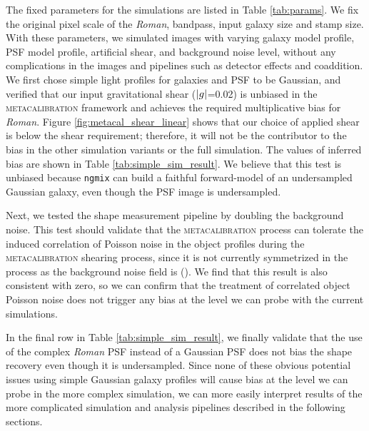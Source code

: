 \documentclass[fleqn,usenatbib]{mnras}
\begin{document}
The fixed parameters for the simulations are listed in Table \ref{tab:params}. We fix the original pixel scale of the \emph{Roman}, bandpass, input galaxy size and stamp size. With these parameters, we simulated images with varying galaxy model profile, PSF model profile, artificial shear, and background noise level, without any complications in the images and pipelines such as detector effects and coaddition. We first chose simple light profiles for galaxies and PSF to be Gaussian, and verified that our input gravitational shear ($\abs{g}$=0.02) is unbiased in the \textsc{metacalibration} framework and achieves the required multiplicative bias for \emph{Roman}. Figure \ref{fig:metacal_shear_linear} shows that our choice of applied shear is below the shear requirement; therefore, it will not be the contributor to the bias in the other simulation variants or the full simulation. The values of inferred bias are shown in Table \ref{tab:simple_sim_result}. We believe that this test is unbiased because \texttt{ngmix} can build a faithful forward-model of an undersampled Gaussian galaxy, even though the PSF image is undersampled.

Next, we tested the shape measurement pipeline by doubling the background noise. This test should validate that the \textsc{metacalibration} process can tolerate the induced correlation of Poisson noise in the object profiles during the \textsc{metacalibration} shearing process, since it is not currently symmetrized in the process as the background noise field is (\citealt{2017ApJ...841...24S}). We find that this result is also consistent with zero, so we can confirm that the treatment of correlated object Poisson noise does not trigger any bias at the level we can probe with the current simulations. 

In the final row in Table \ref{tab:simple_sim_result}, we finally validate that the use of the complex \emph{Roman} PSF instead of a Gaussian PSF does not bias the shape recovery even though it is undersampled. Since none of these obvious potential issues using simple Gaussian galaxy profiles will cause bias at the level we can probe in the more complex simulation, we can more easily interpret results of the more complicated simulation and analysis pipelines described in the following sections. 
\end{document}
